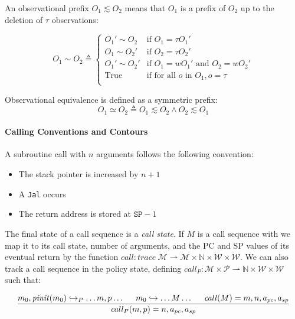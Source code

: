 \documentclass{article}
\begin{document}
    An observational prefix \(O_1 \lesssim O_2\) means that \(O_1\) is a prefix of \(O_2\) up to the deletion
    of \(\tau\) observations:

    \[O_1 \sim O_2 \triangleq
      \begin{cases}
        O_1' \sim O_2 & \text{if } O_1 = \tau O_1' \\
        O_1 \sim O_2' & \text{if } O_2 = \tau O_2' \\
        O_1' \sim O_2' & \text{if } O_1 = w O_1' \text{ and } O_2 = w O_2' \\
        \text{True} & \text{if for all } o \text{ in } O_1, o = \tau \\
      \end{cases}\]

    Observational equivalence is defined as a symmetric prefix:
    \[O_1 \simeq O_2 \triangleq O_1 \lesssim O_2 \land O_2 \lesssim O_1\]

  \paragraph{Calling Conventions and Contours}

      A subroutine call with \(n\) arguments follows the following convention:

      \begin{itemize}
        \item The stack pointer is increased by \(n+1\)
        \item A {\tt Jal} occurs
        \item The return address is stored at \(\mathtt{SP} - 1\)
      \end{itemize}

      The final state of a call sequence is a {\it call state}. If \(M\) is a call sequence with
      we map it to its call state, number of arguments, and the PC and SP values of its eventual
      return by the function \(\mathit{call} : \mathit{trace}\ \mathcal{M} \rightharpoonup \mathcal{M}
      \times \mathbb{N} \times \mathcal{W} \times \mathcal{W}\). We can also track a call sequence in the
      policy state, defining \(\mathit{call}_P : \mathcal{M} \times \mathcal{P} \rightharpoonup \mathbb{N}
      \times \mathcal{W} \times \mathcal{W}\) such that:

      \[\frac{m_0,\mathit{pinit}(m_0) \hookrightarrow_P \dots m,p \dots \hspace{.5cm}
              m_0 \hookrightarrow \dots M \dots \hspace{.5cm} \mathit{call}(M) = m, n, a_{pc}, a_{sp}}
             {\mathit{call}_P(m,p) = n, a_{pc}, a_{sp}}\]
\end{document}
